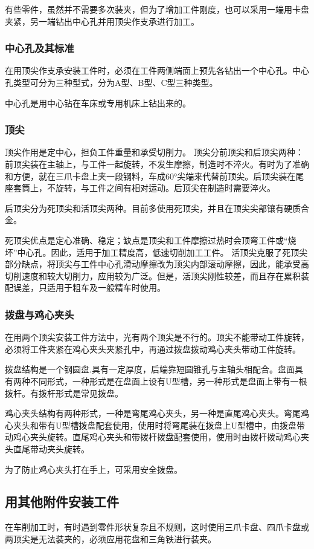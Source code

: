 \documentclass{ctexbook}
\begin{document}
有些零件，虽然并不需要多次装夹，但为了增加工件刚度，也可以采用一端用卡盘夹紧，另一端钻出中心孔并用顶尖作支承进行加工。
\subsubsection{中心孔及其标准}
在用顶尖作支承安装工件时，必须在工件两侧端面上预先各钻出一个中心孔。中心孔类型可分为三种型式，分为A型、B型、C型三种类型。

中心孔是用中心钻在车床或专用机床上钻出来的。
\subsubsection{顶尖}
顶尖作用是定中心，担负工件重量和承受切削力。
顶尖分前顶尖和后顶尖两种：前顶尖装在主轴上，与工件一起旋转，不发生摩擦，制造时不淬火。有时为了准确和方便，就在三爪卡盘上夹一段钢料，车成60°尖端来代替前顶尖。后顶尖装在尾座套筒上，不旋转，与工件之间有相对运动。后顶尖在制造时需要淬火。

后顶尖分为死顶尖和活顶尖两种。目前多使用死顶尖，并且在顶尖尖部镶有硬质合金。

死顶尖优点是定心准确、稳定；缺点是顶尖和工件摩擦过热时会顶弯工件或“烧坏”中心孔。因此，适用于加工精度高，低速切削加工工件。
活顶尖克服了死顶尖部分缺点，将顶尖与工件中心孔滑动摩擦改为顶尖内部滚动摩擦，因此，能承受高切削速度和较大切削力，应用较为广泛。但是，活顶尖刚性较差，而且存在累积装配误差，只适用于粗车及一般精车时使用。
\subsubsection{拨盘与鸡心夹头}
在用两个顶尖安装工件方法中，光有两个顶尖是不行的。顶尖不能带动工件旋转，必须将工件夹紧在鸡心夹头夹紧孔中，再通过拨盘拨动鸡心夹头带动工件旋转。

拨盘结构是一个钢圆盘.具有一定厚度，后端靠短圆锥孔与主轴头相配合。盘面具有两种不同形式，一种形式是在盘面上设有U型槽，另一种形式是盘面上带有一根拨杆。有拨杆形式是常见拨盘。

鸡心夹头结构有两种形式，一种是弯尾鸡心夹头，另一种是直尾鸡心夹头。弯尾鸡心夹头和带有U型槽拨盘配套使用，使用时将弯尾装在拨盘上U型槽中，由拨盘带动鸡心夹头旋转。直尾鸡心夹头和带拨杆拨盘配套使用，使用时由拨杆拨动鸡心夹头直尾带动夹头旋转。

为了防止鸡心夹头打在手上，可采用安全拨盘。
\subsection{用其他附件安装工件}
在车削加工时，有时遇到零件形状复杂且不规则，这时使用三爪卡盘、四爪卡盘或两顶尖是无法装夹的，必须应用花盘和三角铁进行装夹。
\end{document}
